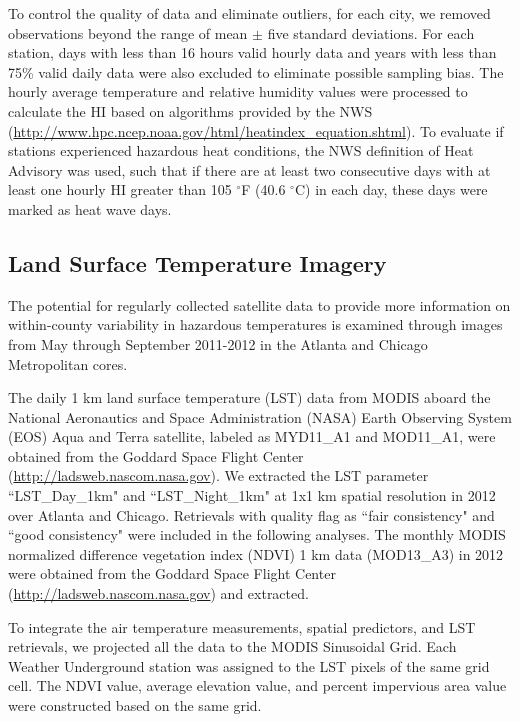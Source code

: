 \documentclass{ametsoc}
\begin{document}
To control the quality of data and eliminate outliers, for each city, we removed observations beyond the range of mean $\pm$ five standard deviations. For each station, days with less than 16 hours valid hourly data and years with less than 75\% valid daily data were also excluded to eliminate possible sampling bias. The hourly average temperature and relative humidity values were processed to calculate the HI based on algorithms provided by the NWS (\url{http://www.hpc.ncep.noaa.gov/html/heatindex_equation.shtml}). To evaluate if stations experienced hazardous heat conditions, the NWS definition of Heat Advisory was used, such that if there are at least two consecutive days with at least one hourly HI greater than 105 $^{\circ}$F (40.6 $^{\circ}$C) in each day, these days were marked as heat wave days.

\subsection{Land Surface Temperature Imagery}\label{subsec:MODISdata}
The potential for regularly collected satellite data to provide more information on within-county variability in hazardous temperatures is examined through images from May through September 2011-2012 in the Atlanta and Chicago Metropolitan cores.  %

The daily 1 km land surface temperature (LST) data from MODIS aboard the National Aeronautics and Space Administration (NASA) Earth Observing System (EOS) Aqua and Terra satellite, labeled as MYD11\_A1 and MOD11\_A1, were obtained from the Goddard Space Flight Center (\url{http://ladsweb.nascom.nasa.gov}). We extracted the LST parameter ``LST\_Day\_1km" and ``LST\_Night\_1km" at 1x1 km spatial resolution in 2012 over Atlanta and Chicago. Retrievals with quality flag as ``fair consistency" and ``good consistency" were included in the following analyses. The monthly MODIS normalized difference vegetation index (NDVI) 1 km data (MOD13\_A3) in 2012 were obtained from the Goddard Space Flight Center (\url{http://ladsweb.nascom.nasa.gov}) and extracted. 

To integrate the air temperature measurements, spatial predictors, and LST retrievals, we projected all the data to the MODIS Sinusoidal Grid. Each Weather Underground station was assigned to the LST pixels of the same grid cell. The NDVI value, average elevation value, and percent impervious area value were constructed based on the same grid. 
\end{document}

